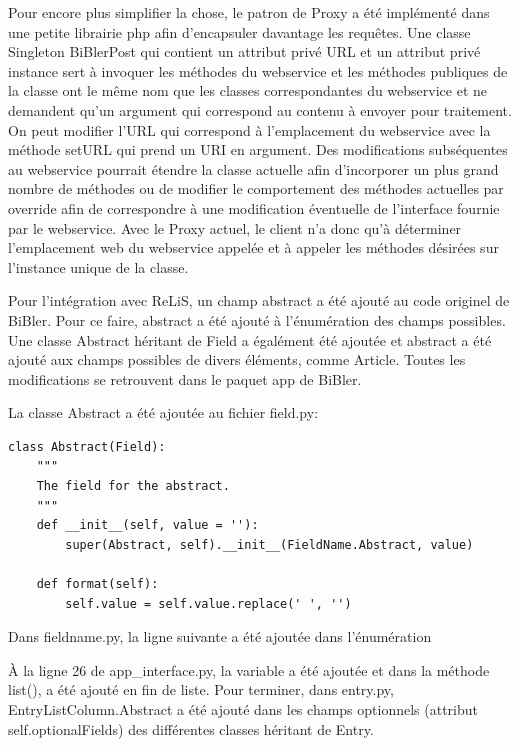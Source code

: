 \documentclass[12pt,titlepage]{article}
\begin{document}
Pour encore plus simplifier la chose, le patron de Proxy a été implémenté dans une petite librairie php afin d'encapsuler davantage les requêtes. Une classe Singleton BiBlerPost qui contient un attribut privé URL et un attribut privé instance sert à invoquer les méthodes du webservice et les méthodes publiques de la classe ont le même nom que les classes correspondantes du webservice et ne demandent qu'un argument qui correspond au contenu à envoyer pour traitement. On peut modifier l'URL qui correspond à l'emplacement du webservice avec la méthode setURL qui prend un URI en argument. Des modifications subséquentes au webservice pourrait étendre la classe actuelle afin d'incorporer un plus grand nombre de méthodes ou de modifier le comportement des méthodes actuelles par override afin de correspondre à une modification éventuelle de l'interface fournie par le webservice. Avec le Proxy actuel, le client n'a donc qu'à déterminer l'emplacement web du webservice appelée et à appeler les méthodes désirées sur l'instance unique de la classe. \newline

Pour l'intégration avec ReLiS, un champ abstract a été ajouté au code originel de BiBler. Pour ce faire, abstract a été ajouté à l'énumération des champs possibles. Une classe Abstract héritant de Field a égalément été ajoutée et abstract a été ajouté aux champs possibles de divers éléments, comme Article. Toutes les modifications se retrouvent dans le paquet app de BiBler. \newline

La classe Abstract a été ajoutée au fichier field.py:
\begin{lstlisting}[style=py]
class Abstract(Field):
    """
    The field for the abstract.
    """
    def __init__(self, value = ''):
        super(Abstract, self).__init__(FieldName.Abstract, value)
        
    def format(self):
        self.value = self.value.replace(' ', '')

\end{lstlisting}

Dans fieldname.py, la ligne suivante a été ajoutée dans l'énumération

À la ligne 26 de app\_interface.py, la variable  a été ajoutée et dans la méthode list(),  a été ajouté en fin de liste. Pour terminer, dans entry.py, EntryListColumn.Abstract a été ajouté dans les champs optionnels (attribut self.optionalFields) des différentes classes héritant de Entry.
\end{document}
